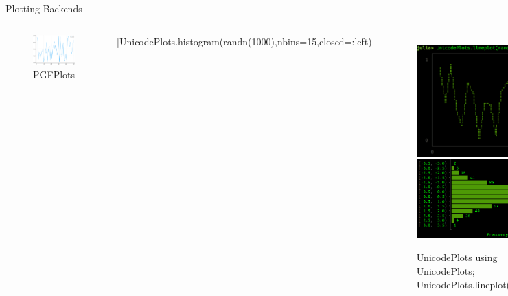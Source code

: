 \documentclass{beamer}
\begin{document}
\begin{frame}[fragile]{Plotting Backends}
\begin{columns}
	\begin{figure}[h]
		\centering
		\includegraphics[width=.75\textwidth]{images_data/randPlotPGF}
		\caption{PGFPlots}
	\end{figure}
	\vspace{-11mm}
	|UnicodePlots.histogram(randn(1000),nbins=15,closed=:left)|
	\begin{figure}[h]
		\centering
		\includegraphics[width=.475\textwidth]{images_data/randPlotUni0}
		\includegraphics[width=.475\textwidth]{images_data/randPlotUni2}
		\caption{
		\centering UnicodePlots\newline 
		\tiny using UnicodePlots; UnicodePlots.lineplot(rand(10))\newline
		\fontsize{5}{5}\selectfont
		\protect{}
		}
	\end{figure}
	\end{columns}
\end{frame}
\end{document}
